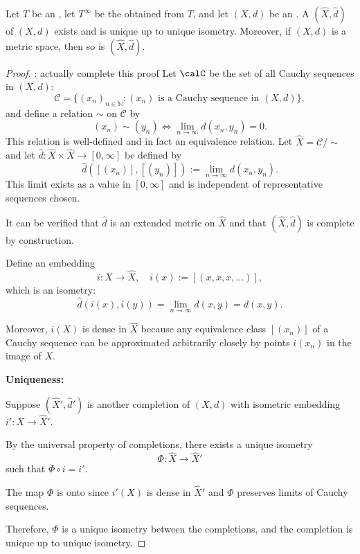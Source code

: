 \begin{proposition}
Let $T$ be an , let $T^\infty$ be the  obtained from $T$, and let $(X,d)$ be an . A  $(\widehat{X}, \widehat{d})$ of $(X,d)$ exists and is unique up to unique isometry. Moreover, if $(X,d)$ is a metric space, then so is $(\widehat{X}, \widehat{d})$.
\end{proposition}
\begin{proof}
    \TODO: actually complete this proof
Let $\calC$ be the set of all Cauchy sequences in \((X,d)\):
\[
\mathcal{C} = \{(x_n)_{n \in \mathbb{N}} : (x_n) \text{ is a Cauchy sequence in } (X,d)\},
\]
and define a relation \(\sim\) on \(\mathcal{C}\) by
\[ (x_n) \sim (y_n) \iff \lim_{n \to \infty} d(x_n, y_n) = 0.  \]
This relation is well-defined and in fact an equivalence relation.  Let \(\widehat{X} = \mathcal{C} / \sim\) and let \(\widehat{d} : \widehat{X} \times \widehat{X} \to [0, \infty]\) be defined by
\[ \widehat{d}([(x_n)], [(y_n)]) := \lim_{n \to \infty} d(x_n, y_n).  \]
This limit exists as a value in $[0,\infty]$ and is independent of representative sequences chosen. 

It can be verified that \(\widehat{d}\) is an extended metric on \(\widehat{X}\) and that \((\widehat{X}, \widehat{d})\) is complete by construction.

Define an embedding
\[
i : X \to \widehat{X}, \quad i(x) := [(x,x,x,\ldots)],
\]
which is an isometry:
\[
\widehat{d}(i(x), i(y)) = \lim_{n \to \infty} d(x,y) = d(x,y).
\]

Moreover, \(i(X)\) is dense in \(\widehat{X}\) because any equivalence class \([(x_n)]\) of a Cauchy sequence can be approximated arbitrarily closely by points \(i(x_n)\) in the image of \(X\).

\bigskip

\textbf{Uniqueness:}

Suppose \((\widehat{X}', \widehat{d}')\) is another completion of \((X,d)\) with isometric embedding \(i' : X \to \widehat{X}'\).

By the universal property of completions, there exists a unique isometry
\[
\Phi : \widehat{X} \to \widehat{X}'
\]
such that \(\Phi \circ i = i'\).

The map \(\Phi\) is onto since \(i'(X)\) is dense in \(\widehat{X}'\) and \(\Phi\) preserves limits of Cauchy sequences.

Therefore, \(\Phi\) is a unique isometry between the completions, and the completion is unique up to unique isometry.
\end{proof}

